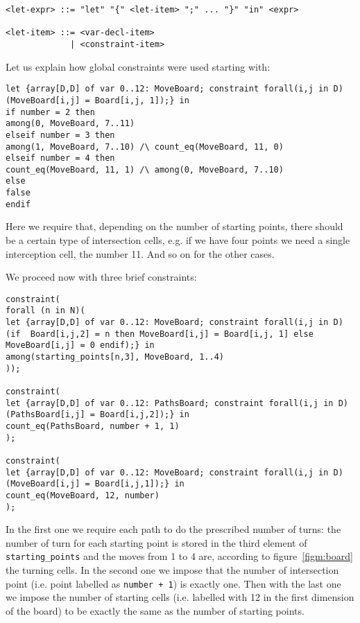 \begin{verbatim}
<let-expr> ::= "let" "{" <let-item> ";" ... "}" "in" <expr>

<let-item> ::= <var-decl-item>
             | <constraint-item>
\end{verbatim}
Let us explain how global constraints were used starting with:

\begin{verbatim}
let {array[D,D] of var 0..12: MoveBoard; constraint forall(i,j in D) (MoveBoard[i,j] = Board[i,j, 1]);} in
if number = 2 then
among(0, MoveBoard, 7..11)
elseif number = 3 then
among(1, MoveBoard, 7..10) /\ count_eq(MoveBoard, 11, 0)
elseif number = 4 then
count_eq(MoveBoard, 11, 1) /\ among(0, MoveBoard, 7..10) 
else
false 
endif
\end{verbatim}
Here we require that, depending on the number of starting points, there should be a certain type of intersection cells, e.g. if we have four points we need a single interception cell, the number 11.
And so on for the other cases.

We proceed now with three brief constraints:
\begin{verbatim}
constraint(
forall (n in N)(
let {array[D,D] of var 0..12: MoveBoard; constraint forall(i,j in D) (if  Board[i,j,2] = n then MoveBoard[i,j] = Board[i,j, 1] else MoveBoard[i,j] = 0 endif);} in
among(starting_points[n,3], MoveBoard, 1..4)
));

constraint(
let {array[D,D] of var 0..12: PathsBoard; constraint forall(i,j in D) (PathsBoard[i,j] = Board[i,j,2]);} in
count_eq(PathsBoard, number + 1, 1)
);

constraint(
let {array[D,D] of var 0..12: MoveBoard; constraint forall(i,j in D) (MoveBoard[i,j] = Board[i,j,1]);} in
count_eq(MoveBoard, 12, number)
);
    \end{verbatim}

In the first one we require each path to do the prescribed number of turns: the number of turn for each starting point is stored in the third element of \texttt{starting_points} and the moves from 1 to 4 are, according to figure~\ref{figm:board} the turning cells. In the second one we impose that the number of intersection point (i.e. point labelled as \texttt{number + 1}) is exactly one. Then with the last one we impose the number of starting cells (i.e. labelled with 12 in the first dimension of the board) to be exactly the same as the number of starting points.
